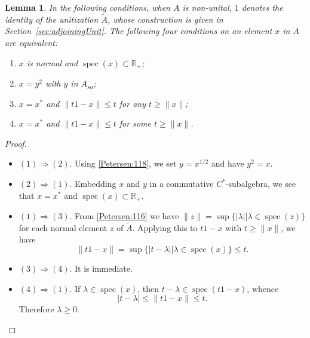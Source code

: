 \documentclass{book}
\newtheorem{lemma}[definition]{Lemma}
\begin{document}
\begin{lemma}\label{Petersen:131}
  In the following conditions, when \(A\) is non-unital, \(1\) denotes the identity of the unitization \(\tilde A\),
  whose construction is given in Section~\ref{sec:adjoiningUnit}.
  The following four conditions on an element \(x\) in \(A\) are equivalent:
  \begin{enumerate}
    \item \(x\) is normal and \(\operatorname{spec}(x)\subset\mathbb{R}_+\);
    \item \(x=y^2\) with \(y\) in \(A_{sa}\);
    \item \(x=x^*\) and \(\|t1-x\|\leq t\) for any \(t\geq\|x\|\);
    \item \(x=x^*\) and \(\|t1-x\|\leq t\) for some \(t\geq\|x\|\).
  \end{enumerate}
\end{lemma}
\begin{proof}
  \begin{itemize}
    \item \((1)\Rightarrow(2)\). Using \ref{Petersen:118}, we set \(y=x^{1/2}\) and have \(y^2=x\).
    \item \((2)\Rightarrow(1)\). Embedding \(x\) and \(y\) in a commutative \(C^*\)-subalgebra, we see that \(x=x^*\) and \(\operatorname{spec}(x)\subset\mathbb{R}_+\).
    \item \((1)\Rightarrow(3)\). From \ref{Petersen:116} we have \(\|z\|=\sup\{|\lambda| | \lambda\in \operatorname{spec}(z)\}\) for each normal element \(z\) of \(\tilde{A}\).
      Applying this to \(t1-x\) with \(t\geq\|x\|\), we have
      \[
        \|t1-x\|=\sup\{|t-\lambda| | \lambda\in \operatorname{spec}(x)\}\leq t.
      \] 
    \item \((3)\Rightarrow(4)\). It is immediate.
    \item \((4)\Rightarrow(1)\). If \(\lambda\in \operatorname{spec}(x)\), then \(t-\lambda\in \operatorname{spec}(t1-x)\), whence
      \[
        |t-\lambda|\leq\|t1-x\|\leq t.
      \]
      Therefore \(\lambda\geq 0\).
  \end{itemize}
\end{proof}
\end{document}

